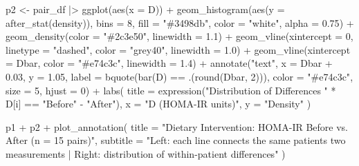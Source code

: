 \documentclass[
  letterpaper,
  DIV=11,
  numbers=noendperiod]{scrartcl}
\newenvironment{Shaded}{\begin{snugshade}}{\end{snugshade}}
\newcommand{\AttributeTok}[1]{\textcolor[rgb]{0.40,0.45,0.13}{#1}}
\newcommand{\DecValTok}[1]{\textcolor[rgb]{0.68,0.00,0.00}{#1}}
\newcommand{\FloatTok}[1]{\textcolor[rgb]{0.68,0.00,0.00}{#1}}
\newcommand{\FunctionTok}[1]{\textcolor[rgb]{0.28,0.35,0.67}{#1}}
\newcommand{\NormalTok}[1]{\textcolor[rgb]{0.00,0.23,0.31}{#1}}
\newcommand{\OtherTok}[1]{\textcolor[rgb]{0.00,0.23,0.31}{#1}}
\newcommand{\SpecialCharTok}[1]{\textcolor[rgb]{0.37,0.37,0.37}{#1}}
\newcommand{\StringTok}[1]{\textcolor[rgb]{0.13,0.47,0.30}{#1}}
\begin{document}
\begin{Shaded}
\begin{Highlighting}[]
\NormalTok{p2 }\OtherTok{\textless{}{-}}\NormalTok{ pair\_df }\SpecialCharTok{|\textgreater{}}
  \FunctionTok{ggplot}\NormalTok{(}\FunctionTok{aes}\NormalTok{(}\AttributeTok{x =}\NormalTok{ D)) }\SpecialCharTok{+}
  \FunctionTok{geom\_histogram}\NormalTok{(}\FunctionTok{aes}\NormalTok{(}\AttributeTok{y =} \FunctionTok{after\_stat}\NormalTok{(density)), }\AttributeTok{bins =} \DecValTok{8}\NormalTok{,}
                 \AttributeTok{fill =} \StringTok{"\#3498db"}\NormalTok{, }\AttributeTok{color =} \StringTok{"white"}\NormalTok{, }\AttributeTok{alpha =} \FloatTok{0.75}\NormalTok{) }\SpecialCharTok{+}
  \FunctionTok{geom\_density}\NormalTok{(}\AttributeTok{color =} \StringTok{"\#2c3e50"}\NormalTok{, }\AttributeTok{linewidth =} \FloatTok{1.1}\NormalTok{) }\SpecialCharTok{+}
  \FunctionTok{geom\_vline}\NormalTok{(}\AttributeTok{xintercept =} \DecValTok{0}\NormalTok{,    }\AttributeTok{linetype =} \StringTok{"dashed"}\NormalTok{,}
             \AttributeTok{color =} \StringTok{"grey40"}\NormalTok{,  }\AttributeTok{linewidth =} \FloatTok{1.0}\NormalTok{) }\SpecialCharTok{+}
  \FunctionTok{geom\_vline}\NormalTok{(}\AttributeTok{xintercept =}\NormalTok{ Dbar, }\AttributeTok{color =} \StringTok{"\#e74c3c"}\NormalTok{, }\AttributeTok{linewidth =} \FloatTok{1.4}\NormalTok{) }\SpecialCharTok{+}
  \FunctionTok{annotate}\NormalTok{(}\StringTok{"text"}\NormalTok{, }\AttributeTok{x =}\NormalTok{ Dbar }\SpecialCharTok{+} \FloatTok{0.03}\NormalTok{, }\AttributeTok{y =} \FloatTok{1.05}\NormalTok{,}
           \AttributeTok{label =} \FunctionTok{bquote}\NormalTok{(}\FunctionTok{bar}\NormalTok{(D) }\SpecialCharTok{==}\NormalTok{ .(}\FunctionTok{round}\NormalTok{(Dbar, }\DecValTok{2}\NormalTok{))),}
           \AttributeTok{color =} \StringTok{"\#e74c3c"}\NormalTok{, }\AttributeTok{size =} \DecValTok{5}\NormalTok{, }\AttributeTok{hjust =} \DecValTok{0}\NormalTok{) }\SpecialCharTok{+}
  \FunctionTok{labs}\NormalTok{(}
    \AttributeTok{title =} \FunctionTok{expression}\NormalTok{(}\StringTok{"Distribution of Differences  "} \SpecialCharTok{*}\NormalTok{ D[i] }\SpecialCharTok{==} \StringTok{"Before"} \SpecialCharTok{{-}} \StringTok{"After"}\NormalTok{),}
    \AttributeTok{x     =} \StringTok{"D (HOMA{-}IR units)"}\NormalTok{,}
    \AttributeTok{y     =} \StringTok{"Density"}
\NormalTok{  )}

\NormalTok{p1 }\SpecialCharTok{+}\NormalTok{ p2 }\SpecialCharTok{+}
  \FunctionTok{plot\_annotation}\NormalTok{(}
    \AttributeTok{title    =} \StringTok{"Dietary Intervention: HOMA{-}IR Before vs. After (n = 15 pairs)"}\NormalTok{,}
    \AttributeTok{subtitle =} \StringTok{"Left: each line connects the same patient\textquotesingle{}s two measurements  |  Right: distribution of within{-}patient differences"}
\NormalTok{  )}
\end{Highlighting}
\end{Shaded}
\end{document}
